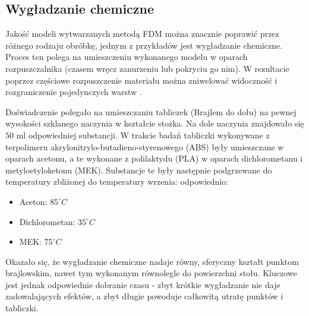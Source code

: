 \documentclass[12pt,a4paper]{article}
\begin{document}
\subsection{Wygładzanie chemiczne}
Jakość modeli wytwarzanych metodą FDM można znacznie poprawić przez różnego rodzaju obróbkę, jednym z przykładów jest wygładzanie chemiczne.
Proces ten polega na umieszczeniu wykonanego modelu w oparach rozpuszczalnika (czasem wręcz zanurzeniu lub pokryciu go nim). W rezultacie poprzez częściowe rozpuszczenie materiału można zniwelować widoczność i rozgraniczenie pojedynczych warstw \cite{postprocessing}.

Doświadczenie polegało na umieszczaniu tabliczek (Brajlem do dołu) na pewnej wysokości szklanego naczynia w kształcie stożka. Na dole naczynia znajdowało się $50 \text{ ml}$ odpowiedniej substancji.  W trakcie badań tabliczki wykonywane z terpolimeru akrylonitrylo-butadieno-styrenowego (ABS) były umieszczane w oparach acetonu, a te wykonane z polilaktydu (PLA) w oparach dichlorometanu i metyloetyloketonu (MEK).
Substancje te były następnie podgrzewane do temperatury zbliżonej do temperatury wrzenia: odpowiednio:
\begin{itemize}
\item Aceton: $85^{\circ} C$
\item Dichlorometan: $35^{\circ} C$
\item MEK: $75^{\circ} C$
\end{itemize} 

Okazało się, że wygładzanie chemiczne nadaje równy, sferyczny kształt punktom brajlowskim, nawet tym wykonanym równolegle do powierzchni stołu. Kluczowe jest jednak odpowiednie dobranie czasu - zbyt krótkie wygładzanie nie daje zadowalających efektów, a zbyt długie powoduje całkowitą utratę punktów i tabliczki.
\end{document}
